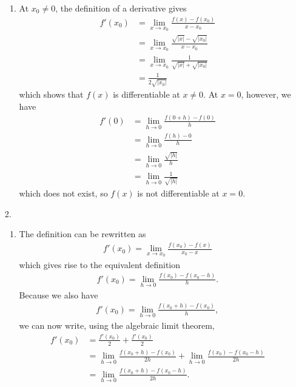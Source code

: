 \documentclass[a4paper,12pt]{article}
\begin{document}
\begin{enumerate}
\begin{enumerate}
                \item
                    At $x_0 \neq 0$, the definition of a derivative gives
                    \begin{align*}
                        f'(x_0) &= \lim_{x \to x_0} \frac{f(x) - f(x_0)}{x - x_0} \\
                        &= \lim_{x \to x_0} \frac{\sqrt{|x|} - \sqrt{|x_0|}}{x - x_0} \\
                        &= \lim_{x \to x_0} \frac{1}{\sqrt{|x|} + \sqrt{|x_0|}} \\
                        &= \frac{1}{2\sqrt{|x_0|}}
                    \end{align*}
                    which shows that $f(x)$ is differentiable at $x \neq 0$. At $x = 0$, however, we have
                    \begin{align*}
                        f'(0) &= \lim_{h \to 0} \frac{f(0 + h) - f(0)}{h} \\
                        &= \lim_{h \to 0} \frac{f(h) - 0}{h} \\
                        &= \lim_{h \to 0} \frac{\sqrt{|h|}}{h} \\
                        &= \lim_{h \to 0} \frac{1}{\sqrt{|h|}}
                    \end{align*}
                    which does not exist, so $f(x)$ is not differentiable at $x = 0$.
            \end{enumerate}

        \item[2.]
            \begin{enumerate}
                \item
                    The definition can be rewritten as
                    \begin{align*}
                        f'(x_0) = \lim_{x \to x_0} \frac{f(x_0) - f(x)}{x_0 - x}
                    \end{align*}
                    which gives rise to the equivalent definition
                    \begin{align*}
                        f'(x_0) = \lim_{h \to 0} \frac{f(x_0) - f(x_0 - h)}{h}.
                    \end{align*}
                    Because we also have
                    \begin{align*}
                        f'(x_0) = \lim_{h \to 0} \frac{f(x_0 + h) - f(x_0)}{h},
                    \end{align*}
                    we can now write, using the algebraic limit theorem,
                    \begin{align*}
                        f'(x_0) &= \frac{f'(x_0)}{2} + \frac{f'(x_0)}{2} \\
                        &= \lim_{h \to 0} \frac{f(x_0 + h) - f(x_0)}{2h} + \lim_{h \to 0} \frac{f(x_0) - f(x_0 - h)}{2h} \\
                        &= \lim_{h \to 0} \frac{f(x_0 + h) - f(x_0 - h)}{2h}.
                    \end{align*}


\end{enumerate}
\end{enumerate}
\end{document}
